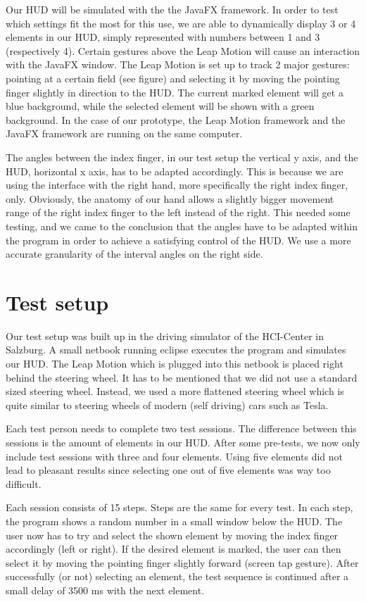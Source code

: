 \documentclass{sigchi-ext}
\begin{document}
Our HUD will be simulated with the the JavaFX framework. In order to test which settings fit the most for this use,
we are able to dynamically display 3 or 4 elements in our HUD, simply represented with numbers between 1 and 3 (respectively 4).
Certain gestures above the Leap Motion will cause an interaction with the JavaFX window.
The Leap Motion is set up to track 2 major gestures: pointing at a certain field (see figure)
and selecting it by moving the pointing finger slightly in direction to the HUD. The current marked element will get a blue background, while the selected element will be shown with a green background. In the case of our prototype,
the Leap Motion framework and the JavaFX framework are running on the same computer.

The angles between the index finger, in our test setup the vertical y axis, and the HUD, horizontal x axis,  has to be adapted accordingly. This is because we are using the
interface with the right hand, more specifically the right index finger, only. Obviously, the anatomy of our hand
allows a slightly bigger movement range of the right index finger to the left instead of the right. This needed some testing, and we came to
the conclusion that the angles have to be adapted within the program in order to achieve a satisfying control of the HUD. We use a more accurate granularity of the interval angles on the 
right side.

\section{Test setup}
Our test setup was built up in the driving simulator of the HCI-Center in Salzburg. A small netbook running eclipse executes the program and simulates our HUD. The Leap Motion which is plugged into this netbook is placed right behind the steering wheel. It has to be mentioned that we did not use a standard sized steering wheel. Instead, we used a more flattened steering wheel which is quite similar to steering wheels of modern (self driving) cars such as Tesla.

Each test person needs to complete two test sessions. The difference between this sessions is the amount of elements in our HUD. After some pre-tests, we now only include test sessions with three and four elements. Using five elements did not lead to pleasant results since selecting one out of five elements was way too difficult.

Each session consists of 15 steps. Steps are the same for every test. In each step, the program shows a random number in a small window below the HUD. The user now has to try and select the shown element by moving the index finger accordingly (left or right). If the desired element is marked, the user can then select it by moving the pointing finger slightly forward (screen tap gesture). After successfully (or not) selecting an element, the test sequence is continued after a small delay of 3500 ms with the next element.
\end{document}
